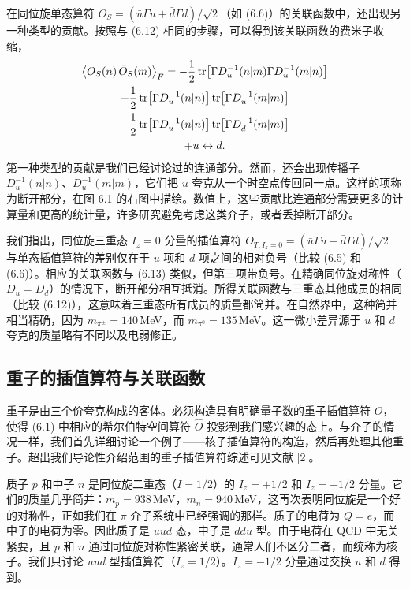 在同位旋单态算符 $O_S = (\bar u\Gamma u + \bar d\Gamma d)/\sqrt{2}$（如 (6.6)）的关联函数中，还出现另一种类型的贡献。按照与 (6.12) 相同的步骤，可以得到该关联函数的费米子收缩，
\begin{multline}
  \big\langle O_S(n)\, \bar{O}_S(m) \big\rangle_F
  = -\frac{1}{2}\operatorname{tr}\!\left[ \Gamma D_u^{-1}(n|m)\Gamma D_u^{-1}(m|n) \right] \\
  + \frac{1}{2}\operatorname{tr}\!\left[ \Gamma D_u^{-1}(n|n) \right]
    \operatorname{tr}\!\left[ \Gamma D_u^{-1}(m|m) \right] \\
  + \frac{1}{2}\operatorname{tr}\!\left[ \Gamma D_u^{-1}(n|n) \right]
    \operatorname{tr}\!\left[ \Gamma D_d^{-1}(m|m) \right] \\
  + u \leftrightarrow d .
\end{multline}
第一种类型的贡献是我们已经讨论过的连通部分。然而，还会出现传播子 $D_u^{-1}(n|n)$、$D_u^{-1}(m|m)$，它们把 $u$ 夸克从一个时空点传回同一点。这样的项称为断开部分，在图 6.1 的右图中描绘。数值上，这些贡献比连通部分需要更多的计算量和更高的统计量，许多研究避免考虑这类介子，或者丢掉断开部分。

我们指出，同位旋三重态 $I_z = 0$ 分量的插值算符 $O_{T,I_z=0} = (\bar u\Gamma u - \bar d\Gamma d)/\sqrt{2}$ 与单态插值算符的差别仅在于 $u$ 项和 $d$ 项之间的相对负号（比较 (6.5) 和 (6.6)）。相应的关联函数与 (6.13) 类似，但第三项带负号。在精确同位旋对称性（$D_u = D_d$）的情况下，断开部分相互抵消。所得关联函数与三重态其他成员的相同（比较 (6.12)），这意味着三重态所有成员的质量都简并。在自然界中，这种简并相当精确，因为 $m_{\pi^\pm} = 140$\,MeV，而 $m_{\pi^0} = 135$\,MeV。这一微小差异源于 $u$ 和 $d$ 夸克的质量略有不同以及电弱修正。

\subsection{重子的插值算符与关联函数}

重子是由三个价夸克构成的客体。必须构造具有明确量子数的重子插值算符 $O$，使得 (6.1) 中相应的希尔伯特空间算符 $\hat{O}$ 投影到我们感兴趣的态上。与介子的情况一样，我们首先详细讨论一个例子——核子插值算符的构造，然后再处理其他重子。超出我们导论性介绍范围的重子插值算符综述可见文献 [2]。

质子 $p$ 和中子 $n$ 是同位旋二重态（$I = 1/2$）的 $I_z = +1/2$ 和 $I_z = -1/2$ 分量。它们的质量几乎简并：$m_p = 938$\,MeV，$m_n = 940$\,MeV，这再次表明同位旋是一个好的对称性，正如我们在 $\pi$ 介子系统中已经强调的那样。质子的电荷为 $Q = e$，而中子的电荷为零。因此质子是 $uud$ 态，中子是 $ddu$ 型。由于电荷在 QCD 中无关紧要，且 $p$ 和 $n$ 通过同位旋对称性紧密关联，通常人们不区分二者，而统称为核子。我们只讨论 $uud$ 型插值算符（$I_z = 1/2$）。$I_z = -1/2$ 分量通过交换 $u$ 和 $d$ 得到。

